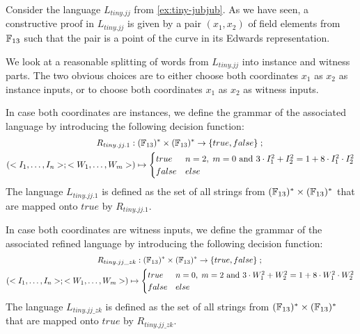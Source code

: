 \begin{example}
\label{ex:tiny-jubjub-instance-witness}
 Consider the language $L_{tiny.jj}$ from \examplename{} \ref{ex:tiny-jubjub}. As we have seen, a constructive proof in $L_{tiny.jj}$ is given by a pair $(x_1,x_2)$ of field elements from $\mathbb{F}_{13}$ such that the pair is a point of the  curve in its Edwards representation.

We look at a reasonable splitting of words from $L_{tiny.jj}$ into instance and witness parts. The two obvious choices are to either choose both coordinates $x_1$ as $x_2$ as instance inputs, or to choose both coordinates $x_1$ as $x_2$ as witness inputs. 

In case both coordinates are instances, we define the grammar of the associated language by introducing the following decision function:
\begin{multline*}
R_{tiny.jj.1} : (\mathbb{F}_{13})^*\times (\mathbb{F}_{13})^* \to \{true, false\}\;;\;\\
(<I_1,\ldots,I_n>;<W_1,\ldots,W_m>) \mapsto
\begin{cases}
true & n=2,\;m=0 \text{ and } 3\cdot I_1^2 + I_2^2 = 1+ 8\cdot I_1^2\cdot I_2^2\\
false & else
\end{cases}
\end{multline*}
The language $L_{tiny.jj.1}$ is defined as the set of all strings from $(\mathbb{F}_{13})^*\times (\mathbb{F}_{13})^*$ that are mapped onto $true$ by $R_{tiny.jj.1}$. 

In case both coordinates are witness inputs, we define the grammar of the associated refined language by introducing the following decision function:
\begin{multline*}
R_{tiny.jj\_zk} : (\mathbb{F}_{13})^*\times (\mathbb{F}_{13})^* \to \{true, false\}\;;\;\\
(<I_1,\ldots,I_n>;<W_1,\ldots,W_m>) \mapsto
\begin{cases}
true & n=0,\;m=2 \text{ and } 3\cdot W_1^2 + W_2^2 = 1+ 8\cdot W_1^2\cdot W_2^2\\
false & else
\end{cases}
\end{multline*}
The language $L_{tiny.jj\_zk}$ is defined as the set of all strings from $(\mathbb{F}_{13})^*\times (\mathbb{F}_{13})^*$ that are mapped onto $true$ by $R_{tiny.jj\_zk}$. 
\end{example}


